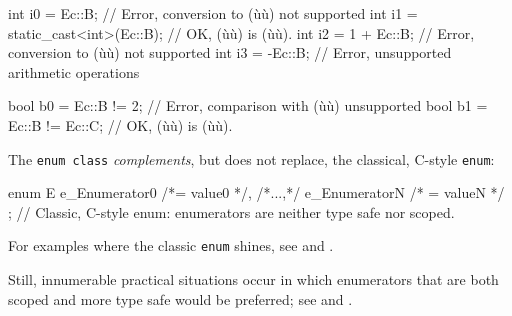 \begin{emcppslisting}
int  i0 = Ec::B;                    // Error, conversion to (ù{}ù) not supported
int  i1 = static_cast<int>(Ec::B);  // OK, (ù{}ù) is (ù{}ù).
int  i2 = 1 + Ec::B;                // Error, conversion to (ù{}ù) not supported
int  i3 = -Ec::B;                   // Error, unsupported arithmetic operations

bool b0 = Ec::B != 2;               // Error, comparison with (ù{}ù) unsupported
bool b1 = Ec::B != Ec::C;           // OK, (ù{}ù) is (ù{}ù).
\end{emcppslisting}

The \lstinline!enum!~\lstinline!class! \emph{complements}, but does not replace, the classical, C-style \lstinline!enum!:

\begin{emcppslisting}
enum E { e_Enumerator0 /*= value0 */, /*...,*/ e_EnumeratorN /* = valueN */ };
    // Classic, C-style enum: enumerators are neither type safe nor scoped.
\end{emcppslisting}

For examples where the classic \lstinline!enum! shines, see  and .

Still, innumerable practical situations occur in which enumerators that are both scoped and more type safe would be preferred; see  and .

%
%

